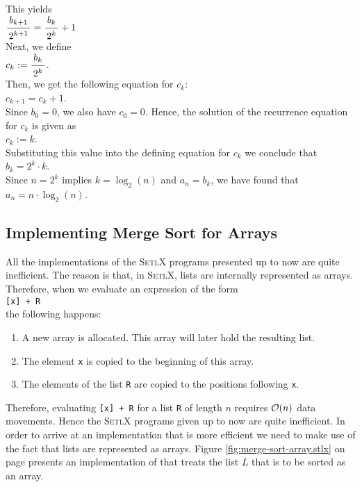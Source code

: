 This yields
\\[0.2cm]
\hspace*{1.3cm}
$\bruch{b_{k+1}}{2^{k+1}} = \bruch{b_k}{2^k} + 1$ 
\\[0.2cm]
Next, we define
\\[0.2cm]
\hspace*{1.3cm}
$c_k := \bruch{b_k}{2^k}$.
\\[0.2cm]
Then, we get the following equation for $c_k$:
\\[0.2cm]
\hspace*{1.3cm}
$c_{k+1} = c_k + 1$.
\\[0.2cm]
Since $b_0 = 0$, we also have $c_0 = 0$.  Hence, the solution of the recurrence equation for $c_k$
is given as
\\[0.2cm]
\hspace*{1.3cm}
$c_k := k$.
\\[0.2cm]
Substituting this value into the defining equation for $c_k$ we conclude that
\\[0.2cm]
\hspace*{1.3cm}
$b_k = 2^k \cdot k$.
\\[0.2cm]
Since $n = 2^k$ implies $k = \log_2(n)$ and $a_n = b_k$, we have found that
\\[0.2cm]
\hspace*{1.3cm}
$a_n = n \cdot \log_2(n)$. 


\subsection{Implementing Merge Sort for Arrays}
All the implementations of the \textsc{SetlX} programs presented up to now are quite inefficient.  The
reason is that, in \textsc{SetlX}, lists are internally represented as arrays.  Therefore, when
we evaluate an expression of the form 
\\[0.2cm]
\hspace*{1.3cm}
\texttt{[x] + R}
\\[0.2cm]
the following happens:
\begin{enumerate}
\item A new array is allocated.  This array will later hold the resulting list.
\item The element \texttt{x} is copied to the beginning of this array.
\item The elements of the list \texttt{R} are copied to the positions following \texttt{x}.
\end{enumerate}
Therefore, evaluating \texttt{[x] + R} for a list \texttt{R} of length $n$ requires $\mathcal{O}(n)$ data
movements.  Hence the \textsc{SetlX} programs given up to now are quite inefficient.  In order to arrive at an
implementation that is more efficient we need to make use of the fact that lists are represented as arrays.
Figure \ref{fig:merge-sort-array.stlx} on page \pageref{fig:merge-sort-array.stlx} presents
an implementation of  that treats the list $L$ that is to be sorted as an array.



